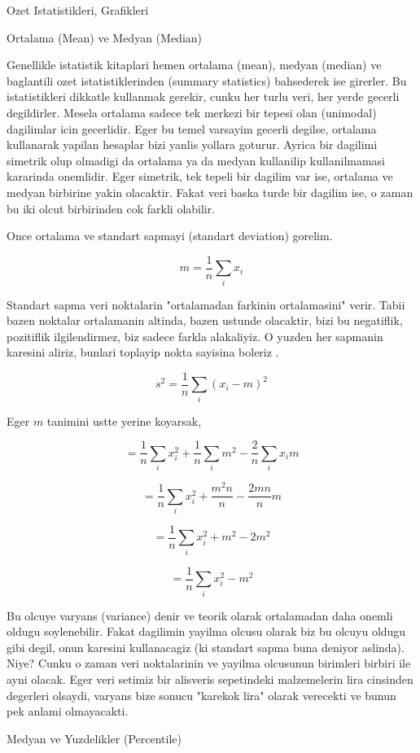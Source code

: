 \documentclass[12pt,fleqn]{article}\usepackage{../common}
\begin{document}
Ozet Istatistikleri, Grafikleri

Ortalama (Mean) ve Medyan (Median)

Genellikle istatistik kitaplari hemen ortalama (mean), medyan (median) ve
baglantili ozet istatistiklerinden (summary statistics) bahsederek ise
girerler. Bu istatistikleri dikkatle kullanmak gerekir, cunku her turlu
veri, her yerde gecerli degildirler. Mesela ortalama sadece tek merkezi bir
tepesi olan (unimodal) dagilimlar icin gecerlidir. Eger bu temel varsayim
gecerli degilse, ortalama kullanarak yapilan hesaplar bizi yanlis yollara
goturur. Ayrica bir dagilimi simetrik olup olmadigi da ortalama ya da
medyan kullanilip kullanilmamasi kararinda onemlidir. Eger simetrik, tek
tepeli bir dagilim var ise, ortalama ve medyan birbirine yakin
olacaktir. Fakat veri baska turde bir dagilim ise, o zaman bu iki olcut
birbirinden cok farkli olabilir.

Once ortalama ve standart sapmayi (standart deviation) gorelim.

$$ m  = \frac{ 1}{n}\sum_i x_i $$

Standart sapma veri noktalarin "ortalamadan farkinin ortalamasini"
verir. Tabii bazen noktalar ortalamanin altinda, bazen ustunde olacaktir,
bizi bu negatiflik, pozitiflik ilgilendirmez, biz sadece farkla
alakaliyiz. O yuzden her sapmanin karesini aliriz, bunlari toplayip nokta
sayisina boleriz .

$$ s^2 = \frac{ 1}{n} \sum_i (x_i - m)^2 $$

Eger $m$ tanimini ustte yerine koyarsak, 

$$ = \frac{ 1}{n} \sum_i x_i^2 + \frac{ 1}{n} \sum_i m^2 - \frac{ 2}{n} \sum_i x_im  $$

$$ = \frac{ 1}{n} \sum_i x_i^2 + \frac{ m^2n}{n} - \frac{ 2mn}{n}m $$

$$ = \frac{ 1}{n} \sum_i x_i^2 +  m^2 - 2m^2 $$

$$ = \frac{ 1}{n} \sum_i x_i^2 - m^2 $$

Bu olcuye varyans (variance) denir ve teorik olarak ortalamadan daha onemli
oldugu soylenebilir. Fakat dagilimin yayilma olcusu olarak biz bu olcuyu
oldugu gibi degil, onun karesini kullanacagiz (ki standart sapma buna
deniyor aslinda). Niye? Cunku o zaman veri noktalarinin ve yayilma olcusunun
birimleri birbiri ile ayni olacak. Eger veri setimiz bir alisveris
sepetindeki malzemelerin lira cinsinden degerleri olsaydi, varyans bize
sonucu "karekok lira" olarak verecekti ve bunun pek anlami olmayacakti. 

Medyan ve Yuzdelikler (Percentile)
\end{document}
